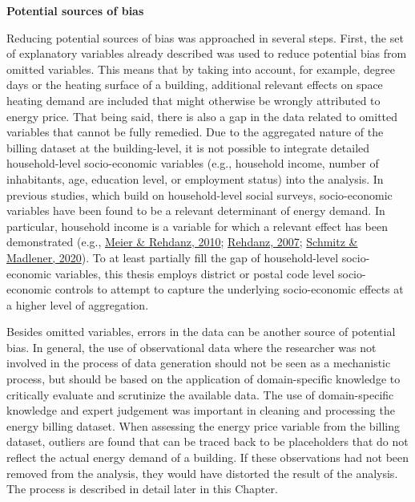 \documentclass[12pt,twoside]{reedthesis}
\begin{document}
\textbf{Potential sources of bias}

Reducing potential sources of bias was approached in several steps. First, the set of explanatory variables already described was used to reduce potential bias from omitted variables. This means that by taking into account, for example, degree days or the heating surface of a building, additional relevant effects on space heating demand are included that might otherwise be wrongly attributed to energy price. That being said, there is also a gap in the data related to omitted variables that cannot be fully remedied. Due to the aggregated nature of the billing dataset at the building-level, it is not possible to integrate detailed household-level socio-economic variables (e.g., household income, number of inhabitants, age, education level, or employment status) into the analysis. In previous studies, which build on household-level social surveys, socio-economic variables have been found to be a relevant determinant of energy demand. In particular, household income is a variable for which a relevant effect has been demonstrated (e.g., \protect\hyperlink{ref-meier_rehdanz10}{Meier \& Rehdanz, 2010}; \protect\hyperlink{ref-rehdanz07}{Rehdanz, 2007}; \protect\hyperlink{ref-schmitz_madlener20}{Schmitz \& Madlener, 2020}). To at least partially fill the gap of household-level socio-economic variables, this thesis employs district or postal code level socio-economic controls to attempt to capture the underlying socio-economic effects at a higher level of aggregation.

Besides omitted variables, errors in the data can be another source of potential bias. In general, the use of observational data where the researcher was not involved in the process of data generation should not be seen as a mechanistic process, but should be based on the application of domain-specific knowledge to critically evaluate and scrutinize the available data. The use of domain-specific knowledge and expert judgement was important in cleaning and processing the energy billing dataset. When assessing the energy price variable from the billing dataset, outliers are found that can be traced back to be placeholders that do not reflect the actual energy demand of a building. If these observations had not been removed from the analysis, they would have distorted the result of the analysis. The process is described in detail later in this Chapter.
\end{document}
